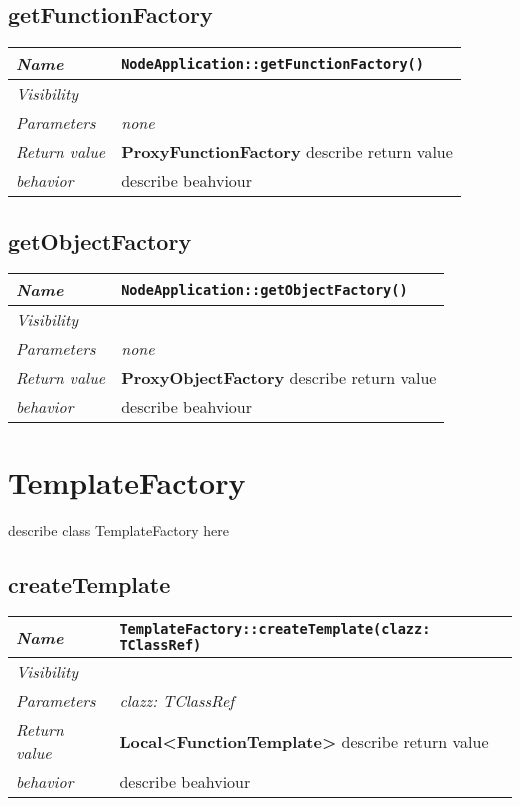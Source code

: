  \section{getFunctionFactory}
\begin{longtable}{p{3cm} @{\hskip 1cm} p{12cm}}
 \hline
\textit{Name} & \texttt{NodeApplication::getFunctionFactory()}\\
\hline
 \textit{Visibility} & \\
\hline
\textit{Parameters} & \textit{none}\\
\hline
\textit{Return value} & \textbf{ ProxyFunctionFactory} describe return value\\
  \hline
 \textit{behavior} & describe beahviour \\
\hline
\end{longtable} \pagebreak
 \section{getObjectFactory}
\begin{longtable}{p{3cm} @{\hskip 1cm} p{12cm}}
 \hline
\textit{Name} & \texttt{NodeApplication::getObjectFactory()}\\
\hline
 \textit{Visibility} & \\
\hline
\textit{Parameters} & \textit{none}\\
\hline
\textit{Return value} & \textbf{ ProxyObjectFactory} describe return value\\
  \hline
 \textit{behavior} & describe beahviour \\
\hline
\end{longtable} \pagebreak
 \chapter{TemplateFactory}
describe class TemplateFactory here
\section{createTemplate}
\begin{longtable}{p{3cm} @{\hskip 1cm} p{12cm}}
 \hline
\textit{Name} & \texttt{TemplateFactory::createTemplate(clazz: TClassRef)}\\
\hline
 \textit{Visibility} & \\
\hline
\textit{Parameters} & \textit{clazz: TClassRef}\\
\hline
\textit{Return value} & \textbf{ Local<FunctionTemplate>} describe return value\\
  \hline
 \textit{behavior} & describe beahviour \\
\hline
\end{longtable} \pagebreak
